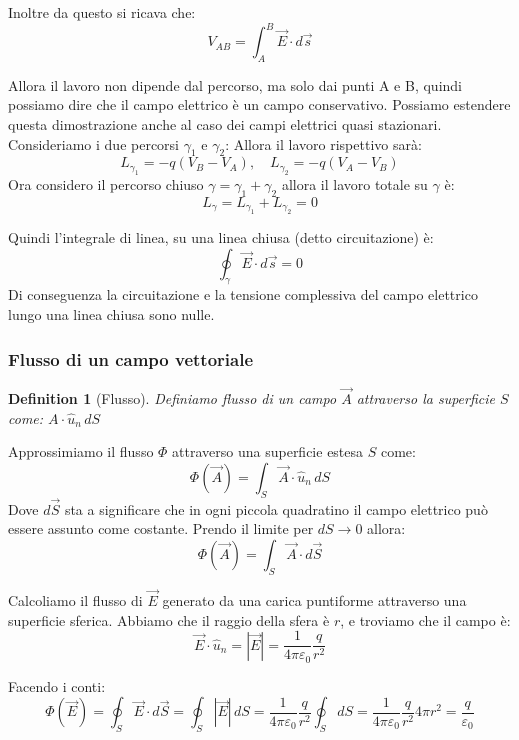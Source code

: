 \documentclass[12pt, a4paper]{article}
\newtheorem{definition}{Definition}[section]
\begin{document}
Inoltre da questo si ricava che:
\[
V_{AB} = \int_A^B \vec{E} \cdot d\vec{s}
\]

Allora il lavoro non dipende dal percorso, ma solo dai punti A e B, quindi possiamo dire che il campo elettrico è un campo conservativo.
Possiamo estendere questa dimostrazione anche al caso dei campi elettrici quasi stazionari. Consideriamo i due percorsi $\gamma_1$ e $\gamma_2$:
Allora il lavoro rispettivo sarà:
\[
L_{\gamma_1} = -q (V_B - V_A), \quad L_{\gamma_2} = -q (V_A - V_B)
\]
Ora considero il percorso chiuso $\gamma = \gamma_1 + \gamma_2$ allora il lavoro totale su $\gamma$ è:
\[
L_\gamma = L_{\gamma_1} + L_{\gamma_2} = 0
\]

\newpage

Quindi l'integrale di linea, su una linea chiusa (detto circuitazione) è:
\[
\oint_\gamma \vec{E} \cdot d\vec{s} = 0
\]
Di conseguenza la circuitazione e la tensione complessiva del campo elettrico lungo una linea chiusa sono nulle.

\subsubsection{Flusso di un campo vettoriale}
\begin{definition}[Flusso]
Definiamo flusso di un campo $\vec{A}$ attraverso la superficie $S$ come: $A \cdot \hat{u}_n \, dS$
\end{definition}

\begin{figure}[h]
    \centering
\end{figure}

Approssimiamo il flusso $\Phi$ attraverso una superficie estesa $S$ come:
\[
\Phi(\vec{A}) = \int_S \vec{A} \cdot \hat{u}_n \, dS
\]
Dove $d\vec{S}$ sta a significare che in ogni piccola quadratino il campo elettrico può essere assunto come costante.
Prendo il limite per $dS \to 0$ allora:
\[
\Phi(\vec{A}) = \int_S \vec{A} \cdot d\vec{S}
\]

Calcoliamo il flusso di $\vec{E}$ generato da una carica puntiforme attraverso una superficie sferica. Abbiamo che il raggio della sfera è $r$, e troviamo che il campo è:
\[
\vec{E} \cdot \hat{u}_n = |\vec{E}| = \frac{1}{4\pi\varepsilon_0} \frac{q}{r^2}
\]

Facendo i conti:
\[
\Phi(\vec{E}) = \oint_S \vec{E} \cdot d\vec{S} = \oint_S |\vec{E}| \, dS = \frac{1}{4\pi\varepsilon_0} \frac{q}{r^2} \oint_S dS = \frac{1}{4\pi\varepsilon_0} \frac{q}{r^2} 4\pi r^2 = \frac{q}{\varepsilon_0}
\]
\end{document}
